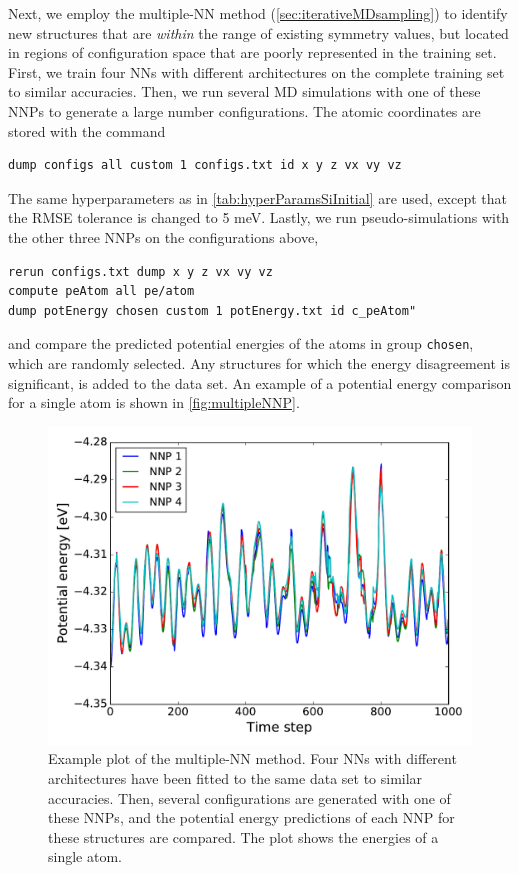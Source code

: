 \documentclass[twoside,english]{uiofysmaster}
\begin{document}
Next, we employ the multiple-NN method (\autoref{sec:iterativeMDsampling}) to identify new structures 
that are \textit{within} the range of existing symmetry values, but located in regions of configuration space 
that are poorly represented in the training set. First, we train four NNs with different architectures on 
the complete training set to similar accuracies. 
Then, we run several MD simulations with one of these NNPs
to generate a large number configurations. The atomic coordinates are stored with the command
\begin{lstlisting}[style=lammps]
dump configs all custom 1 configs.txt id x y z vx vy vz
\end{lstlisting}
The same hyperparameters as in \autoref{tab:hyperParamsSiInitial} are used, 
except that the RMSE tolerance is changed to 5 meV. Lastly, we run pseudo-simulations with the other three NNPs
on the configurations above, 
\begin{lstlisting}[style=lammps]
rerun configs.txt dump x y z vx vy vz
compute peAtom all pe/atom
dump potEnergy chosen custom 1 potEnergy.txt id c_peAtom"
\end{lstlisting}
and compare the predicted potential energies of the atoms in group \texttt{chosen}, which are randomly selected. 
Any structures for which the energy disagreement is significant, is added to the data set. An example of a 
potential energy comparison for a single atom is shown in \autoref{fig:multipleNNP}. 
\begin{figure}
\centering
  \includegraphics[width = 0.7\linewidth]{Figures/Results/multipleNNP.pdf}
  \caption{Example plot of the multiple-NN method. Four NNs with different architectures have been fitted to the same 
           data set to similar accuracies. Then, several configurations are generated with one of these NNPs, and 
           the potential energy predictions of each NNP for these structures are compared. The plot shows 
           the energies of a single atom.}
  \label{fig:multipleNNP}
\end{figure}
\end{document}
